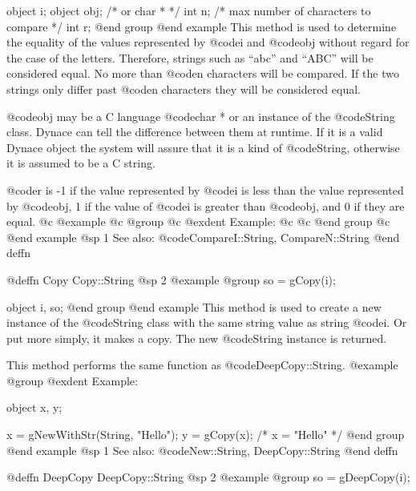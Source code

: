 object  i;
object  obj;  /*  or char *  */
int     n;    /*  max number of characters to compare  */
int     r;
@end group
@end example
This method is used to determine the equality of the values represented
by @code{i} and @code{obj} without regard for the case of the letters.
Therefore, strings such as ``abc'' and ``ABC'' will be considered equal.
No more than @code{n} characters will be compared.  If the two strings
only differ past @code{n} characters they will be considered equal.

@code{obj} may be a C language @code{char *} or an instance of the
@code{String} class.  Dynace can tell the difference between them at
runtime.  If it is a valid Dynace object the system will assure that it is
a kind of @code{String}, otherwise it is assumed to be a C string.

@code{r} is -1 if the value represented by @code{i} is less than the
value represented by @code{obj}, 1 if the value of @code{i} is greater
than @code{obj}, and 0 if they are equal.
@c @example
@c @group
@c @exdent Example:
@c
@c @end group
@c @end example
@sp 1
See also:  @code{CompareI::String, CompareN::String}
@end deffn














@deffn {Copy} Copy::String
@sp 2
@example
@group
so = gCopy(i);

object  i, so;
@end group
@end example
This method is used to create a new instance of the @code{String} class
with the same string value as string @code{i}.  Or put more simply,
it makes a copy.  The new @code{String} instance is returned.

This method performs the same function as @code{DeepCopy::String}.
@example
@group
@exdent Example:

object  x, y;

x = gNewWithStr(String, "Hello");
y = gCopy(x);
/*  x = "Hello"  */
@end group
@end example
@sp 1
See also:  @code{New::String, DeepCopy::String}
@end deffn













@deffn {DeepCopy} DeepCopy::String
@sp 2
@example
@group
so = gDeepCopy(i);

